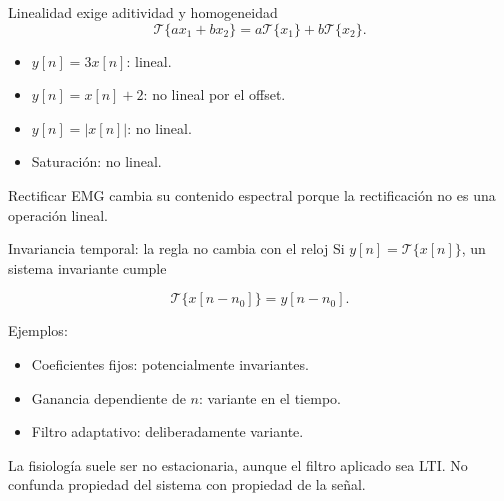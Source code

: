 \documentclass[
  ignorenonframetext,
  aspectratio=169,
  spanish,
  professionalfonts]{beamer}
\providecommand{\tightlist}{%
  \setlength{\itemsep}{0pt}\setlength{\parskip}{0pt}}
\begin{document}
\begin{frame}{Linealidad exige aditividad y homogeneidad}
\protect{}\label{linealidad-exige-aditividad-y-homogeneidad}
\[
\mathcal{T}\{a x_1+b x_2\}=a\mathcal{T}\{x_1\}+b\mathcal{T}\{x_2\}.
\]

\begin{itemize}
\tightlist
\item
  \(y[n]=3x[n]\): lineal.
\item
  \(y[n]=x[n]+2\): no lineal por el offset.
\item
  \(y[n]=|x[n]|\): no lineal.
\item
  Saturación: no lineal.
\end{itemize}

\begin{tcolorbox}[enhanced jigsaw, arc=.35mm, bottomrule=.15mm, bottomtitle=1mm, breakable, colback=white, colbacktitle=quarto-callout-important-color!10!white, colframe=quarto-callout-important-color-frame, coltitle=black, left=2mm, leftrule=.75mm, opacityback=0, opacitybacktitle=0.6, rightrule=.15mm, title={Consecuencia}, titlerule=0mm, toprule=.15mm, toptitle=1mm]

Rectificar EMG cambia su contenido espectral porque la rectificación no
es una operación lineal.

\end{tcolorbox}
\end{frame}

\begin{frame}{Invariancia temporal: la regla no cambia con el reloj}
\protect{}\label{invariancia-temporal-la-regla-no-cambia-con-el-reloj}
Si \(y[n]=\mathcal{T}\{x[n]\}\), un sistema invariante cumple

\[
\mathcal{T}\{x[n-n_0]\}=y[n-n_0].
\]

Ejemplos:

\begin{itemize}
\tightlist
\item
  Coeficientes fijos: potencialmente invariantes.
\item
  Ganancia dependiente de \(n\): variante en el tiempo.
\item
  Filtro adaptativo: deliberadamente variante.
\end{itemize}

\begin{tcolorbox}[enhanced jigsaw, arc=.35mm, bottomrule=.15mm, bottomtitle=1mm, breakable, colback=white, colbacktitle=quarto-callout-note-color!10!white, colframe=quarto-callout-note-color-frame, coltitle=black, left=2mm, leftrule=.75mm, opacityback=0, opacitybacktitle=0.6, rightrule=.15mm, title={Contexto biomédico}, titlerule=0mm, toprule=.15mm, toptitle=1mm]

La fisiología suele ser no estacionaria, aunque el filtro aplicado sea
LTI. No confunda propiedad del sistema con propiedad de la señal.

\end{tcolorbox}
\end{frame}
\end{document}

